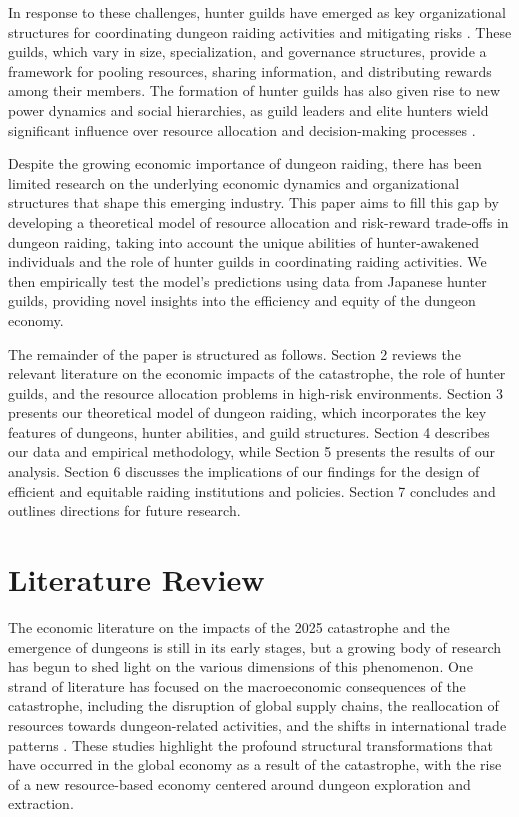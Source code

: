 \documentclass[12pt, a4paper]{article}
\begin{document}
In response to these challenges, hunter guilds have emerged as key organizational structures for coordinating dungeon raiding activities and mitigating risks \citep{kim2027emergence}. These guilds, which vary in size, specialization, and governance structures, provide a framework for pooling resources, sharing information, and distributing rewards among their members. The formation of hunter guilds has also given rise to new power dynamics and social hierarchies, as guild leaders and elite hunters wield significant influence over resource allocation and decision-making processes \citep{nakamura2027rise}.

Despite the growing economic importance of dungeon raiding, there has been limited research on the underlying economic dynamics and organizational structures that shape this emerging industry. This paper aims to fill this gap by developing a theoretical model of resource allocation and risk-reward trade-offs in dungeon raiding, taking into account the unique abilities of hunter-awakened individuals and the role of hunter guilds in coordinating raiding activities. We then empirically test the model's predictions using data from Japanese hunter guilds, providing novel insights into the efficiency and equity of the dungeon economy.

The remainder of the paper is structured as follows. Section 2 reviews the relevant literature on the economic impacts of the catastrophe, the role of hunter guilds, and the resource allocation problems in high-risk environments. Section 3 presents our theoretical model of dungeon raiding, which incorporates the key features of dungeons, hunter abilities, and guild structures. Section 4 describes our data and empirical methodology, while Section 5 presents the results of our analysis. Section 6 discusses the implications of our findings for the design of efficient and equitable raiding institutions and policies. Section 7 concludes and outlines directions for future research.

\section{Literature Review}
The economic literature on the impacts of the 2025 catastrophe and the emergence of dungeons is still in its early stages, but a growing body of research has begun to shed light on the various dimensions of this phenomenon. One strand of literature has focused on the macroeconomic consequences of the catastrophe, including the disruption of global supply chains, the reallocation of resources towards dungeon-related activities, and the shifts in international trade patterns \citep{kawamoto2026macroeconomic, singh2027global}. These studies highlight the profound structural transformations that have occurred in the global economy as a result of the catastrophe, with the rise of a new resource-based economy centered around dungeon exploration and extraction.
\end{document}
